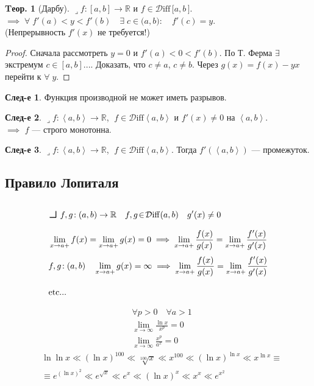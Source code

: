 \documentclass[a4paper,12pt]{article}
\numberwithin{figure}{section}
\theoremstyle{definition}
\newtheorem{theorem}{Tеор.}[section]
\newtheorem*{corollary}{След-е} %
\def\R{\mathbb{R}}
\def\Diff{\!\in\!\mathcal{D}\mathrm{iff}}
\def\on{\!:}
\def\intab{\left<a,b\right>}
\def\lets{{\huge$\lrcorner$}\space}
\def\any{$\forall\;$}
\begin{document}
\begin{theorem}[Дарбу]
	\lets $f\on[a,b]\to\R$ и $f\Diff \, \pmb{\pmb{[}} a,b \,\pmb{\pmb{]}}$. \\
	$\implies \; \forall\; f'(a) < y < f'(b) \quad \exists \; c\in\pmb{(}a,b\pmb{)}: \quad f'(c)=y$. \\
	(Непрерывность $f'(x)$ не требуется!)
\end{theorem}
\begin{proof}
	Сначала рассмотреть $y=0$ и $f'(a)<0<f'(b)$.
	По Т. Ферма $\exists$ экстремум $c\in[a,b]$....
	Доказать, что $c \ne a$, $c \ne b$.
	Через $g(x)=f(x)-yx$ перейти к \any$y$.
\end{proof}

\begin{corollary}
	Функция производной не может иметь разрывов.
\end{corollary}

\begin{corollary}
	\lets $f\on\intab\to\R$, $\;f\Diff\intab$ и $f'(x)\ne 0$ на $\intab$. \\
	$\implies$ $f$ --- строго монотонна.
\end{corollary}

\begin{corollary}
	\lets $f\on\intab\to\R$, $\;f\Diff\intab$. Тогда $f'(\intab)$ --- промежуток.
\end{corollary}



\subsection{Правило Лопиталя}

\begin{align*}
&	\text{\lets } f,g\on(a,b)\to\R \quad f,g\Diff(a,b) \quad g'(x) \ne 0
\\
&	\lim_{x\to a+}f(x) = \lim_{x\to a+}g(x) = 0 \implies
	\lim_{x\to a+} \frac{f(x)}{g(x)} = \lim_{x\to a+}\frac{f'(x)}{g'(x)}
\\
&	f,g\on(a,b) \quad \lim_{x\to a+}g(x) = \infty \implies
	\lim_{x\to a+} \frac{f(x)}{g(x)} = \lim_{x\to a+}\frac{f'(x)}{g'(x)}
\\
&	\text{etc...}
\end{align*}
\begin{align*}
&	\forall p>0 \quad \forall a>1			\\
&	\lim_{x\to\infty}\frac{\ln x}{x^p} = 0	\\
&	\lim_{x\to\infty}\frac{x^p}{a^x} = 0
\end{align*}
\begin{align*}
&	\ln \ln x		\ll
	(\ln x)^{100}	\ll
	\sqrt[100]{x}	\ll
	x^{100}			\ll
	(\ln x)^{\ln x}	\ll
	x^{\ln x} \equiv \\ & \equiv
	e^{(\ln x)^2}	\ll
	e^{\sqrt{x}}	\ll
	e^x				\ll
	(\ln x)^x		\ll
	x^x				\ll
	e^{x^2}
\end{align*}
\end{document}
